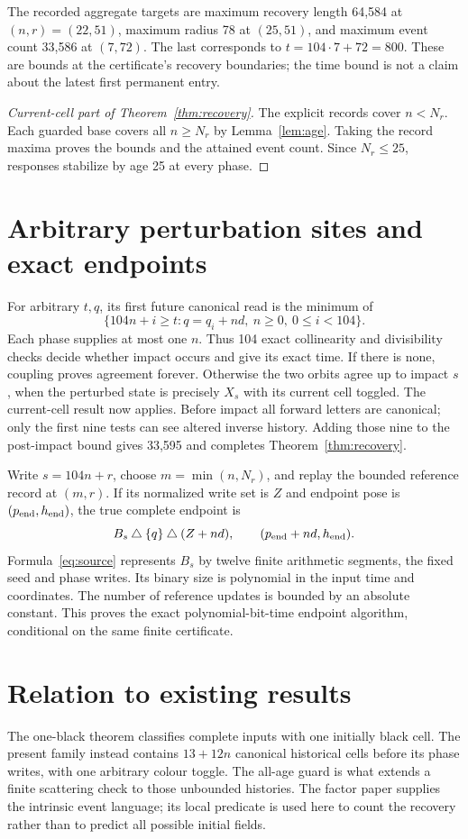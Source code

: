 \documentclass[11pt]{article}
\newcommand{\xor}{\mathbin{\triangle}}
\begin{document}
The recorded aggregate targets are maximum recovery length 64,584 at
$(n,r)=(22,51)$, maximum radius 78 at $(25,51)$, and maximum event count
33,586 at $(7,72)$. The last corresponds to $t=104\cdot7+72=800$.
These are bounds at the certificate's recovery boundaries; the time bound
is not a claim about the latest first permanent entry.

\begin{proof}[Current-cell part of Theorem~\ref{thm:recovery}]
The explicit records cover $n<N_r$. Each guarded base covers all $n\ge N_r$
by Lemma~\ref{lem:age}. Taking the record maxima proves the bounds and the
attained event count. Since $N_r\le25$, responses stabilize by age 25 at
every phase.
\end{proof}

\section{Arbitrary perturbation sites and exact endpoints}
For arbitrary $t,q$, its first future canonical read is the minimum of
\[
 \{104n+i\ge t:q=q_i+nd,\ n\ge0,\ 0\le i<104\}.
\]
Each phase supplies at most one $n$. Thus 104 exact collinearity and
divisibility checks decide whether impact occurs and give its exact time.
If there is none, coupling proves agreement forever. Otherwise the two
orbits agree up to impact $s$, when the perturbed state is precisely $X_s$
with its current cell toggled. The current-cell result now applies.
Before impact all forward letters are canonical; only the first nine tests
can see altered inverse history. Adding those nine to the post-impact bound
gives 33,595 and completes Theorem~\ref{thm:recovery}.

Write $s=104n+r$, choose $m=\min(n,N_r)$, and replay the bounded reference
record at $(m,r)$. If its normalized write set is $Z$ and endpoint pose is
$(p_{\rm end},h_{\rm end})$, the true complete endpoint is
\[
 B_s\xor\{q\}\xor(Z+nd),\qquad
 (p_{\rm end}+nd,h_{\rm end}).
\]
Formula~\eqref{eq:source} represents $B_s$ by twelve finite arithmetic
segments, the fixed seed and phase writes. Its binary size is polynomial in
the input time and coordinates. The number of reference updates is bounded
by an absolute constant. This proves the exact polynomial-bit-time endpoint
algorithm, conditional on the same finite certificate.

\section{Relation to existing results}
The one-black theorem classifies complete inputs with one initially black
cell. The present family instead contains $13+12n$ canonical historical
cells before its phase writes, with one arbitrary colour toggle. The
all-age guard is what extends a finite scattering check to those unbounded
histories. The factor paper supplies the intrinsic event language; its
local predicate is used here to count the recovery rather than to predict
all possible initial fields.
\end{document}
